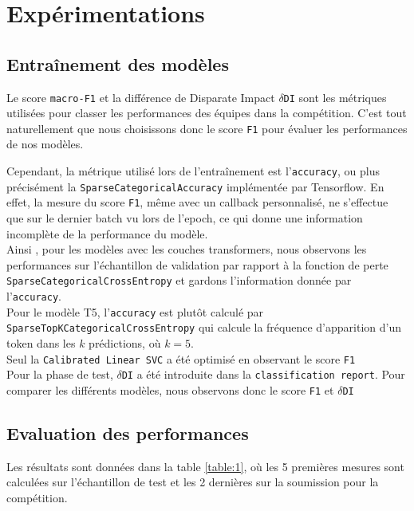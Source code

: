 \chapter{Expérimentations}

\section{Entraînement des modèles}
\label{sec:entrainement}
Le score \texttt{macro-F1} et la différence de Disparate Impact $\delta$\texttt{DI} sont les métriques utilisées pour classer les performances des équipes dans la compétition. C'est tout naturellement que nous choisissons donc le score \texttt{F1} pour évaluer les performances de nos modèles.

Cependant, la métrique utilisé lors de l'entraînement est l'\texttt{accuracy}, ou plus précisément la \texttt{SparseCategoricalAccuracy} implémentée par Tensorflow. En effet, la mesure du score \texttt{F1}, même avec un callback personnalisé, ne s'effectue que sur le dernier batch vu lors de l'epoch, ce qui donne une information incomplète de la performance du modèle.\\
Ainsi , pour les modèles avec les couches transformers, nous observons les performances sur l'échantillon de validation par rapport à la fonction de perte \texttt{SparseCategoricalCrossEntropy} et gardons l'information donnée par l'\texttt{accuracy}.\\
Pour le modèle T5, l'\texttt{accuracy} est plutôt calculé par \texttt{SparseTopKCategoricalCrossEntropy} qui calcule la fréquence d'apparition d'un token dans les $k$ prédictions, où $k = 5$.\\
Seul la \texttt{Calibrated Linear SVC} a été optimisé en observant le score \texttt{F1}
\hfill\\

Pour la phase de test, $\delta$\texttt{DI} a été introduite dans la \texttt{classification report}. Pour comparer les différents modèles, nous observons donc le score \texttt{F1} et $\delta$\texttt{DI}

\section{Evaluation des performances}
Les résultats sont données dans la table \ref{table:1}, où les 5 premières mesures sont calculées sur l'échantillon de test et les 2 dernières sur la soumission pour la compétition.
\hfill\\

